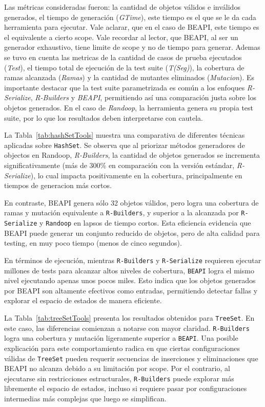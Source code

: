 Las métricas consideradas fueron: la cantidad de objetos válidos e inválidos generados, el tiempo 
de generación (\emph{GTime}), este tiempo es el que se le da cada herramienta para ejecutar. Vale aclarar,
que en el caso de BEAPI, este tiempo es el equivalente a cierto scope. Vale recordar al lector, que BEAPI, al ser un generador exhaustivo,
tiene limite de scope y no de tiempo para generar. 
Ademas se tuvo en cuenta las metricas de la cantidad de casos de prueba ejecutados (\emph{Test}), el 
tiempo total de ejecución de la test suite (\emph{T(Seg)}), la cobertura de ramas alcanzada 
(\emph{Ramas}) y la cantidad de mutantes eliminados (\emph{Mutacion}). Es importante destacar 
que la test suite parametrizada es común a los enfoques \emph{R-Serialize}, \emph{R-Builders} 
y \emph{BEAPI}, permitiendo así una comparación justa sobre los objetos generados. En el caso de 
\emph{Randoop}, la herramienta genera su propia test suite, por lo que los resultados deben 
interpretarse con cautela.



La Tabla~\ref{tab:hashSetTools} muestra una comparativa de diferentes técnicas aplicadas sobre 
\texttt{HashSet}. Se observa que al priorizar métodos generadores de objectos en Randoop, \emph{R-Builders}, la cantidad de 
objetos generados se incrementa significativamente (más de 300\% en comparación con la versión 
estándar, \emph{R-Serialize}), lo cual impacta positivamente en la cobertura, principalmente en tiempos de generacion más cortos.

En contraste, \textsf{BEAPI} genera sólo 32 objetos válidos, pero logra una cobertura de ramas y 
mutación equivalente a \texttt{R-Builders}, y superior a la alcanzada por \texttt{R-Serialize} y 
\texttt{Randoop} en lapsos de tiempo cortos. Esta eficiencia evidencia que BEAPI puede generar un 
conjunto reducido de objetos, pero de alta calidad para testing, en muy poco tiempo (menos de cinco 
segundos).

En términos de ejecución, mientras \texttt{R-Builders} y \texttt{R-Serialize} requieren ejecutar 
millones de tests para alcanzar altos niveles de cobertura, \texttt{BEAPI} logra el mismo nivel 
ejecutando apenas unos pocos miles. Esto indica que los objetos generados por \textsf{BEAPI} son 
altamente efectivos como entradas, permitiendo detectar fallas y explorar el espacio de estados 
de manera eficiente.

La Tabla~\ref{tab:treeSetTools} presenta los resultados obtenidos para \texttt{TreeSet}. En 
este caso, las diferencias comienzan a notarse con mayor claridad. \texttt{R-Builders} logra 
una cobertura y mutación ligeramente superior a \texttt{BEAPI}. Una posible explicación para 
este comportamiento radica en que ciertas configuraciones válidas de \texttt{TreeSet} pueden 
requerir secuencias de inserciones y eliminaciones que BEAPI no alcanza debido a su 
limitación por scope. Por el contrario, al ejecutarse sin restricciones estructurales, 
\texttt{R-Builders} puede explorar más libremente el espacio de estados, incluso si requiere 
pasar por configuraciones intermedias más complejas que luego se simplifican.

